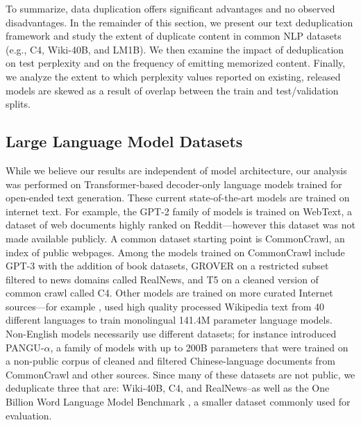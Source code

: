 To summarize, data duplication offers significant advantages and no observed disadvantages.
In the remainder of this section, we present our text deduplication framework and study the extent of duplicate content in common NLP datasets (e.g., C4, Wiki-40B, and LM1B).
We then examine the impact of deduplication on test perplexity and on the frequency of emitting memorized content.
Finally, we analyze the extent to which perplexity values reported on existing, released models are skewed as a result of overlap between the train and test/validation splits.

\subsection{Large Language Model Datasets}
While we believe our results are independent of model architecture,
our analysis was performed on Transformer-based decoder-only language models \citep{vaswani2017attention} trained for open-ended text generation.
These current state-of-the-art models are trained on internet text.
For example, the GPT-2 family of models \cite{radford2019language} is trained on WebText, a dataset of web documents highly ranked on Reddit---however this dataset was not made available publicly.
A common dataset starting point is CommonCrawl, an index of public webpages.
Among the models trained on CommonCrawl include
GPT-3 \cite{brown2020language} with the addition of book datasets,
GROVER \cite{zellers2019defending} on a restricted subset filtered to news domains called RealNews,
and T5 \cite{raffel2019exploring} on a cleaned version of common crawl called C4.
Other models are trained on more curated Internet sources---for example \citet{guo2020wiki40b}, used high quality processed Wikipedia text from 40 different languages to train monolingual 141.4M parameter language models.
Non-English models necessarily use different datasets; \citet{zeng2021pangualpha} for instance introduced PANGU-$\alpha$, a family of models with up to 200B parameters that were trained on a non-public corpus of cleaned and filtered Chinese-language documents from CommonCrawl and other sources.
Since many of these datasets are not public,
we deduplicate three that are: Wiki-40B, C4, and RealNews--as well as the One Billion Word Language Model Benchmark \citep{chelba2013one}, 
a smaller
dataset commonly used for evaluation.

